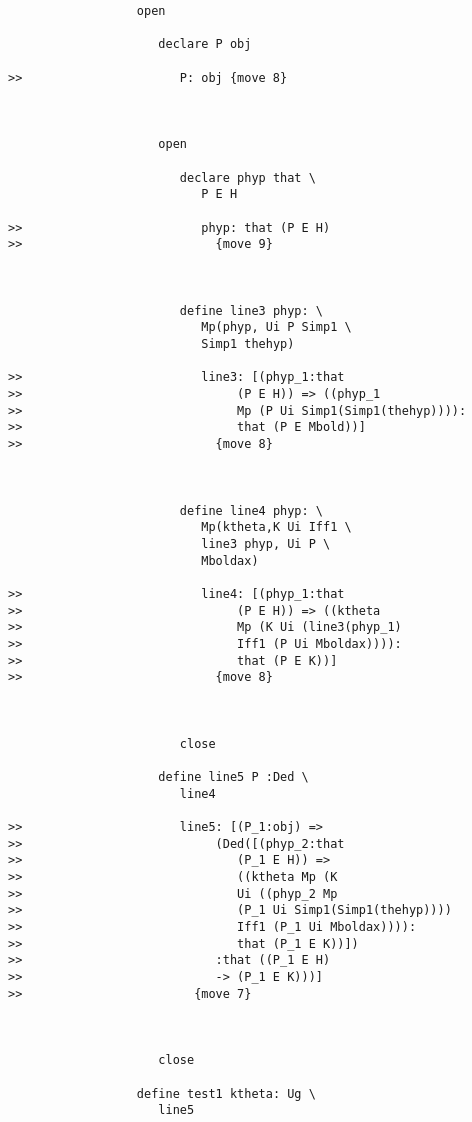 \documentclass[12pt]{article}
\begin{document}
\begin{verbatim}
                  open

                     declare P obj

>>                      P: obj {move 8}



                     open

                        declare phyp that \
                           P E H

>>                         phyp: that (P E H)
>>                           {move 9}



                        define line3 phyp: \
                           Mp(phyp, Ui P Simp1 \
                           Simp1 thehyp)

>>                         line3: [(phyp_1:that
>>                              (P E H)) => ((phyp_1
>>                              Mp (P Ui Simp1(Simp1(thehyp)))):
>>                              that (P E Mbold))]
>>                           {move 8}



                        define line4 phyp: \
                           Mp(ktheta,K Ui Iff1 \
                           line3 phyp, Ui P \
                           Mboldax)

>>                         line4: [(phyp_1:that
>>                              (P E H)) => ((ktheta
>>                              Mp (K Ui (line3(phyp_1)
>>                              Iff1 (P Ui Mboldax)))):
>>                              that (P E K))]
>>                           {move 8}



                        close

                     define line5 P :Ded \
                        line4

>>                      line5: [(P_1:obj) =>
>>                           (Ded([(phyp_2:that
>>                              (P_1 E H)) =>
>>                              ((ktheta Mp (K
>>                              Ui ((phyp_2 Mp
>>                              (P_1 Ui Simp1(Simp1(thehyp))))
>>                              Iff1 (P_1 Ui Mboldax)))):
>>                              that (P_1 E K))])
>>                           :that ((P_1 E H)
>>                           -> (P_1 E K)))]
>>                        {move 7}



                     close

                  define test1 ktheta: Ug \
                     line5


\end{verbatim}
\end{document}
